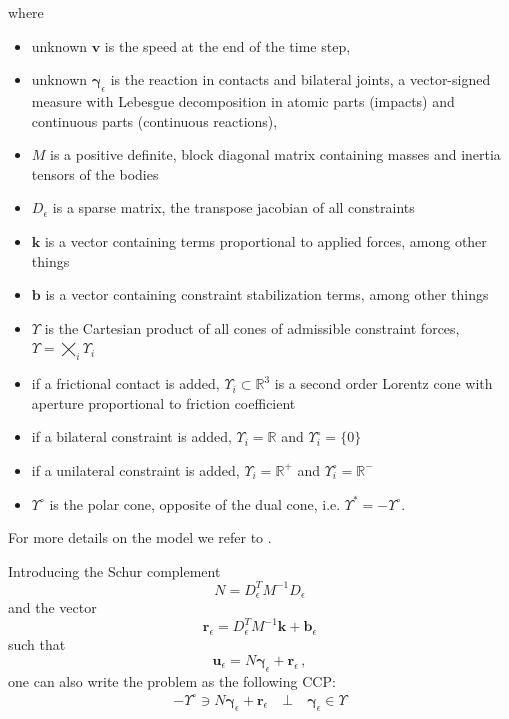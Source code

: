 \documentclass{svproc}
\newcommand{\vect}[1]{\bm{#1}}
\begin{document}
where 
\begin{itemize}
		\item unknown $\vect{v}$ is the speed at the end of the time step, 
		\item unknown $\vect{\gamma}_\epsilon$ is the reaction in contacts and bilateral joints, a vector-signed measure with Lebesgue decomposition in atomic parts (impacts) and continuous parts (continuous reactions),
    \item $M$ is a positive definite, block diagonal matrix containing masses and inertia tensors of the bodies
    \item $D_\epsilon$ is a sparse matrix, the transpose jacobian of all constraints
    \item $\vect{k}$ is a vector containing terms proportional to applied forces, among other things 
    \item $\vect{b}$ is a vector containing constraint stabilization terms, among other things
    \item $\Upsilon$ is the Cartesian product of all cones of admissible constraint forces, $\Upsilon = \bigtimes_i \Upsilon_i$
    \item if a frictional contact is added, $\Upsilon_i \subset \mathbb{R}^3$ is a second order Lorentz cone with aperture proportional to friction coefficient
    \item if a bilateral constraint is added, $\Upsilon_i = \mathbb{R}$ and $\Upsilon^\circ_i = \{0\}$
    \item if a unilateral constraint is added, $\Upsilon_i = \mathbb{R}^+$ and $\Upsilon^\circ_i = \mathbb{R}^-$
    \item $\Upsilon^{\circ}$ is the polar cone, opposite of the dual cone, i.e. $\Upsilon^{*} = -\Upsilon^\circ$.
\end{itemize}

For more details on the model we refer to 
\cite{negrutSerbanTasoraJCND2017}. %

Introducing the Schur complement 
\[
N=D_{\epsilon}^T M^{-1} D_{\epsilon}
\]
and the vector
\[
\vect{r}_\epsilon = D_{\epsilon}^T M^{-1} \vect{k} + \vect{b}_\epsilon
\]
such that
\[
\vect{u}_\epsilon = N \vect{\gamma}_\epsilon + \vect{r}_\epsilon \, , 
\]
one can also write the problem as the following CCP:
\begin{align}
    -\Upsilon^{\circ} \ni  N \vect{\gamma}_\epsilon + \vect{r}_\epsilon 
    \quad \bot \quad  
    \vect{\gamma}_\epsilon \in \Upsilon
	\label{eq:ChronoCCP}
\end{align}
\end{document}

